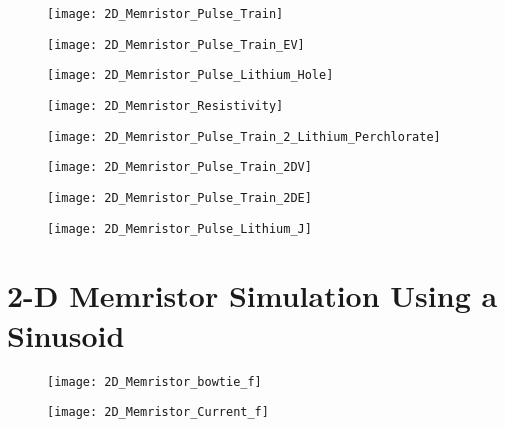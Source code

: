 \begin{figure}[!htp]
\centering
\texttt{[image: 2D\_Memristor\_Pulse\_Train]}
\caption{} 
\label{}
\end{figure}


\begin{figure}[!htp]
\centering
\texttt{[image: 2D\_Memristor\_Pulse\_Train\_EV]}
\caption{} 
\label{}
\end{figure}

\begin{figure}[!htp]
\centering
\texttt{[image: 2D\_Memristor\_Pulse\_Lithium\_Hole]}
\caption{} 
\label{}
\end{figure}

\begin{figure}[!htp]
\centering
\texttt{[image: 2D\_Memristor\_Resistivity]}
\caption{} 
\label{}
\end{figure}

\begin{figure}[!htp]
\centering
\texttt{[image: 2D\_Memristor\_Pulse\_Train\_2\_Lithium\_Perchlorate]}
\caption{} 
\label{}
\end{figure}

\begin{figure}[!htp]
\centering
\texttt{[image: 2D\_Memristor\_Pulse\_Train\_2DV]}
\caption{} 
\label{}
\end{figure}

\begin{figure}[!htp]
\centering
\texttt{[image: 2D\_Memristor\_Pulse\_Train\_2DE]}
\caption{} 
\label{}
\end{figure}


\begin{figure}[!htp]
\centering
\texttt{[image: 2D\_Memristor\_Pulse\_Lithium\_J]}
\caption{} 
\label{}
\end{figure}


\clearpage
\section{2-D Memristor Simulation Using a Sinusoid}

\begin{figure}[!htp]
\centering
\texttt{[image: 2D\_Memristor\_bowtie\_f]}
\caption{} 
\label{}
\end{figure}


\begin{figure}[!htp]
\centering
\texttt{[image: 2D\_Memristor\_Current\_f]}
\caption{} 
\label{}
\end{figure}


